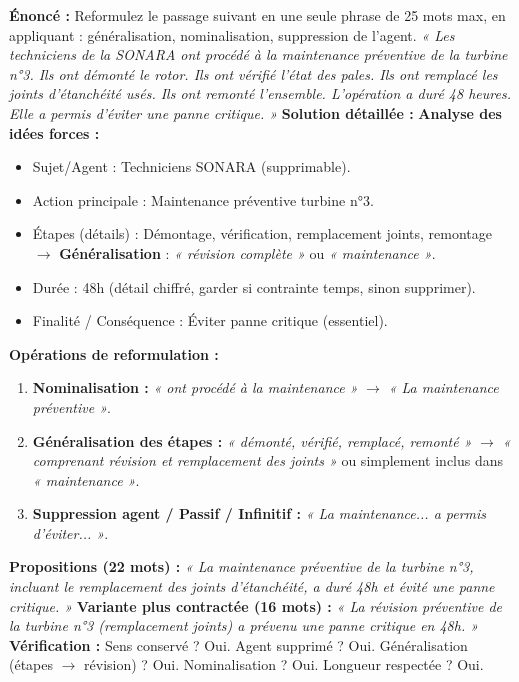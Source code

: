 \documentclass[11pt]{article}
\begin{document}
\begin{exoresolu}
    \textbf{Énoncé :} Reformulez le passage suivant en une seule phrase de 25 mots max, en appliquant : généralisation, nominalisation, suppression de l'agent.
    \medskip
    \emph{« Les techniciens de la SONARA ont procédé à la maintenance préventive de la turbine n°3. Ils ont démonté le rotor. Ils ont vérifié l'état des pales. Ils ont remplacé les joints d'étanchéité usés. Ils ont remonté l'ensemble. L'opération a duré 48 heures. Elle a permis d'éviter une panne critique. »}
    \tcblower
    \textbf{Solution détaillée :}
    \textbf{Analyse des idées forces :}
    \begin{itemize}
        \item Sujet/Agent : Techniciens SONARA (supprimable).
        \item Action principale : Maintenance préventive turbine n°3.
        \item Étapes (détails) : Démontage, vérification, remplacement joints, remontage $\rightarrow$ \textbf{Généralisation} : \emph{« révision complète »} ou \emph{« maintenance »}.
        \item Durée : 48h (détail chiffré, garder si contrainte temps, sinon supprimer).
        \item Finalité / Conséquence : Éviter panne critique (essentiel).
    \end{itemize}
    \textbf{Opérations de reformulation :}
    \begin{enumerate}
        \item \textbf{Nominalisation :} \emph{« ont procédé à la maintenance »} $\rightarrow$ \emph{« La maintenance préventive »}.
        \item \textbf{Généralisation des étapes :} \emph{« démonté, vérifié, remplacé, remonté »} $\rightarrow$ \emph{« comprenant révision et remplacement des joints »} ou simplement inclus dans \emph{« maintenance »}.
        \item \textbf{Suppression agent / Passif / Infinitif :} \emph{« La maintenance... a permis d'éviter... »}.
    \end{enumerate}
    \textbf{Propositions (22 mots) :}
    \emph{« La maintenance préventive de la turbine n°3, incluant le remplacement des joints d'étanchéité, a duré 48h et évité une panne critique. »}
    \textbf{Variante plus contractée (16 mots) :}
    \emph{« La révision préventive de la turbine n°3 (remplacement joints) a prévenu une panne critique en 48h. »}
    \textbf{Vérification :} Sens conservé ? Oui. Agent supprimé ? Oui. Généralisation (étapes $\rightarrow$ révision) ? Oui. Nominalisation ? Oui. Longueur respectée ? Oui.
\end{exoresolu}
\end{document}
